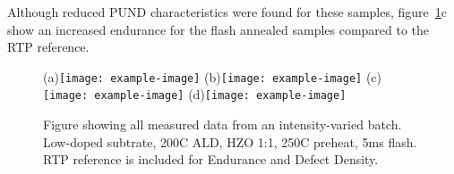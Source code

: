 \documentclass[11pt,twoside]{eitExjobb}
\begin{document}
Although reduced PUND characteristics were found for these samples, figure~\ref{fig:res_FlashIntC}c show an increased endurance for the flash annealed samples compared to the RTP reference.

\begin{figure}[htbp]
    \centering
    (a)\texttt{[image: example-image]}
    (b)\texttt{[image: example-image]}
    (c)\texttt{[image: example-image]}
    (d)\texttt{[image: example-image]}
    \caption{Figure showing all measured data from an intensity-varied batch. Low-doped subtrate, 200C ALD, HZO 1:1, 250C preheat, 5ms flash. RTP reference is included for Endurance and Defect Density.}\label{fig:res_FlashIntC}
\end{figure}



\end{document}
